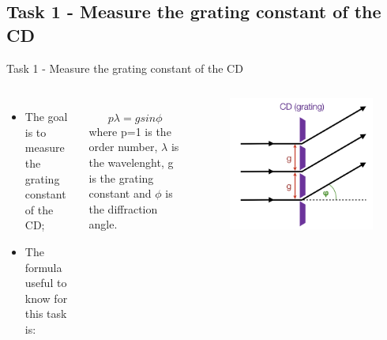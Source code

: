 \documentclass[9pt, xcolor=dvipsnames]{beamer}
\begin{document}
\subsection{ Task 1 - Measure the grating constant of the CD}
\begin{frame}{Task 1 - Measure the grating constant of the CD}
\begin{columns}
	\begin{itemize}
		\item The goal is to measure the grating constant of the CD;
		\item The formula useful to know for this task is:
	\end{itemize}
	~\\
	\begin{equation}
		p \lambda = g sin \phi
	\end{equation}
	where p=1 is the order number, $\lambda$ is the wavelenght, g is the grating constant and $\phi $ is the diffraction angle.
	
		\begin{figure}
		\begin{centering}
			\centering
			\includegraphics[width=1 \textwidth]{Figures/grid.png}
		\end{centering}
		\end{figure}
	\end{columns}

\end{frame}
\end{document}
